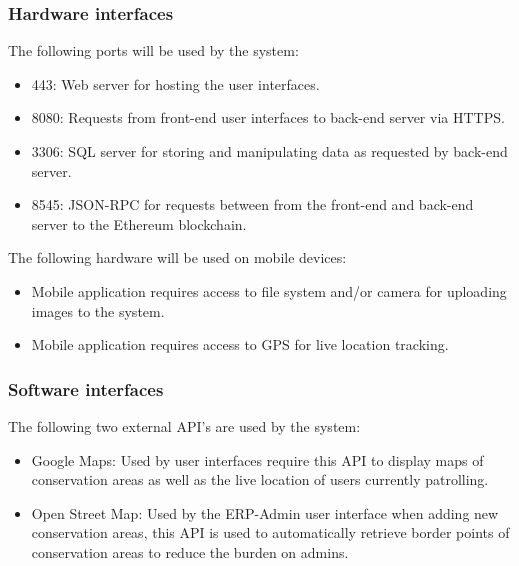 \documentclass{article}
\begin{document}
\subsubsection{Hardware interfaces}
The following ports will be used by the system:
\begin{itemize}
\item 443: Web server for hosting the user interfaces.
\item 8080: Requests from front-end user interfaces to back-end server via HTTPS.
\item 3306: SQL server for storing and manipulating data as requested by back-end server.
\item 8545: JSON-RPC for requests between from the front-end and back-end server to the Ethereum blockchain.
\end{itemize}

The following hardware will be used on mobile devices:
\begin{itemize}
\item Mobile application requires access to file system and/or camera for uploading images to the system.
\item Mobile application requires access to GPS for live location tracking.
\end{itemize}

\subsubsection{Software interfaces}
The following two external API's are used by the system:
\begin{itemize}
\item Google Maps: Used by user interfaces require this API to display maps of conservation areas as well as the live location of users currently patrolling.
\item Open Street Map: Used by the ERP-Admin user interface when adding new conservation areas, this API is used to automatically retrieve border points of conservation areas to reduce the burden on admins.
\end{itemize}
\end{document}
